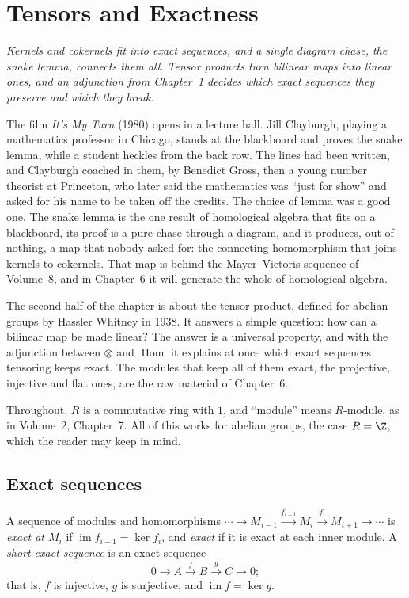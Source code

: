 \chapter{Tensors and Exactness}

\begin{center}\itshape
Kernels and cokernels fit into exact sequences, and a single diagram chase, the snake lemma, connects them all. Tensor products turn bilinear maps into linear ones, and an
adjunction from Chapter~1 decides which exact sequences they preserve and which they break.
\end{center}

The film \emph{It's My Turn} (1980) opens in a lecture hall. Jill Clayburgh, playing a mathematics professor in Chicago, stands at the blackboard and proves the snake lemma, while a
student heckles from the back row. The lines had been written, and Clayburgh coached in them, by Benedict Gross, then a young number theorist at Princeton, who later said the
mathematics was ``just for show'' and asked for his name to be taken off the credits. The choice of lemma was a good one. The snake lemma is the one result of homological algebra
that fits on a blackboard, its proof is a pure chase through a diagram, and it produces, out of nothing, a map that nobody asked for: the connecting homomorphism that joins
kernels to cokernels. That map is behind the Mayer--Vietoris sequence of Volume~8, and in Chapter~6 it will generate the whole of homological algebra.

The second half of the chapter is about the tensor product, defined for abelian groups by Hassler Whitney in 1938. It answers a simple question: how can a bilinear map be made
linear? The answer is a universal property, and with the adjunction between $\otimes$ and $\operatorname{Hom}$ it explains at once which exact sequences tensoring keeps exact. The
modules that keep all of them exact, the projective, injective and flat ones, are the raw material of Chapter~6.

Throughout, $R$ is a commutative ring with $1$, and ``module'' means $R$-module, as in Volume~2, Chapter~7. All of this works for abelian groups, the case $R=\Z$, which the reader may keep in mind.

\section{Exact sequences}

\begin{definition}\label{def:exact}
A sequence of modules and homomorphisms $\cdots\to M_{i-1}\xrightarrow{f_{i-1}}M_i\xrightarrow{f_i}M_{i+1}\to\cdots$ is \emph{exact at $M_i$} if $\operatorname{im}f_{i-1}=\ker f_i$, and \emph{exact} if it is exact
at each inner module. A \emph{short exact sequence} is an exact sequence
\[0\to A\xrightarrow{f}B\xrightarrow{g}C\to0;\]
that is, $f$ is injective, $g$ is surjective, and $\operatorname{im}f=\ker g$.
\end{definition}

